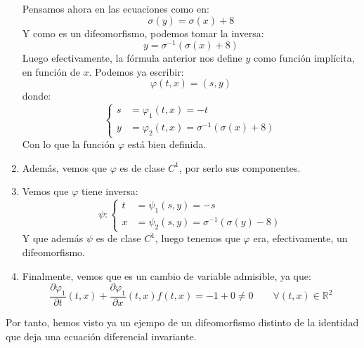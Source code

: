 \begin{ejemplo}
\begin{enumerate}
            Pensamos ahora en las ecuaciones como en:
            \begin{equation*}
                \sigma(y) = \sigma(x) + 8
            \end{equation*}
            Y como es un difeomorfismo, podemos tomar la inversa:
            \begin{equation*}
                y = \sigma^{-1}(\sigma(x)+8)
            \end{equation*}
            Luego efectivamente, la fórmula anterior nos define $y$ como función implícita, en función de $x$. Podemos ya escribir:
            \begin{equation*}
                \varphi(t,x) = (s,y)
            \end{equation*}
            donde:
            \begin{equation*}
                \left\{\begin{array}{rl}
                        s &= \varphi_1(t,x) = -t \\
                        y &= \varphi_2(t,x) = \sigma^{-1}(\sigma(x) + 8)
                \end{array}\right.
            \end{equation*}
            Con lo que la función $\varphi$ está bien definida.

        \item Además, vemos que $\varphi$ es de clase $C^1$, por serlo sus componentes.
        \item Vemos que $\varphi$ tiene inversa:
            \begin{equation*}
                \psi: \left\{\begin{array}{rl}
                        t &= \psi_1(s,y) = -s \\
                        x &= \psi_2(s,y) = \sigma^{-1}(\sigma(y)-8)
                \end{array}\right.
            \end{equation*}
            Y que además $\psi$ es de clase $C^1$, luego tenemos que $\varphi$ era, efectivamente, un difeomorfismo.
        \item Finalmente, vemos que es un cambio de variable admisible, ya que:
            \begin{equation*}
                \dfrac{\partial \varphi_1}{\partial t}(t,x) + \dfrac{\partial\varphi_1}{\partial x}(t,x)f(t,x) = -1 + 0 \neq 0 \qquad \forall (t,x)\in \mathbb{R}^2
            \end{equation*}
    \end{enumerate}
    Por tanto, hemos visto ya un ejempo de un difeomorfismo distinto de la identidad que deja una ecuación diferencial invariante.
\end{ejemplo}

